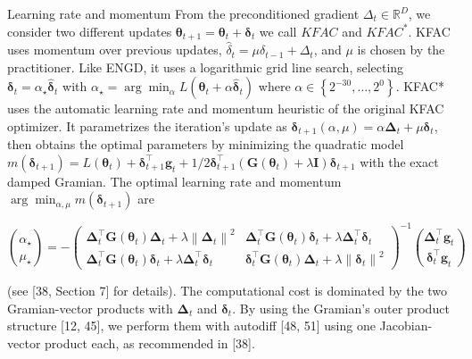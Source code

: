 \documentclass[10pt]{article}
\begin{document}
Learning rate and momentum From the preconditioned gradient $\Delta_{t} \in \mathbb{R}^{D}$, we consider two different updates $\boldsymbol{\theta}_{t+1}=\boldsymbol{\theta}_{t}+\boldsymbol{\delta}_{t}$ we call $K F A C$ and $K F A C^{*}$. KFAC uses momentum over previous updates, $\hat{\delta}_{t}=\mu \delta_{t-1}+\Delta_{t}$, and $\mu$ is chosen by the practitioner. Like ENGD, it uses a logarithmic grid line search, selecting $\boldsymbol{\delta}_{t}=\alpha_{\star} \hat{\boldsymbol{\delta}}_{t}$ with $\alpha_{\star}=\arg \min _{\alpha} L\left(\boldsymbol{\theta}_{t}+\alpha \hat{\boldsymbol{\delta}}_{t}\right)$ where $\alpha \in\left\{2^{-30}, \ldots, 2^{0}\right\}$. KFAC* uses the automatic learning rate and momentum heuristic of the original KFAC optimizer. It parametrizes the iteration's update as $\boldsymbol{\delta}_{t+1}(\alpha, \mu)=\alpha \boldsymbol{\Delta}_{t}+\mu \boldsymbol{\delta}_{t}$, then obtains the optimal parameters by minimizing the quadratic model $m\left(\boldsymbol{\delta}_{t+1}\right)=L\left(\boldsymbol{\theta}_{t}\right)+\boldsymbol{\delta}_{t+1}^{\top} \boldsymbol{g}_{t}+1 / 2 \boldsymbol{\delta}_{t+1}^{\top}\left(\boldsymbol{G}\left(\boldsymbol{\theta}_{t}\right)+\lambda \boldsymbol{I}\right) \boldsymbol{\delta}_{t+1}$ with the exact damped Gramian. The optimal learning rate and momentum $\arg \min _{\alpha, \mu} m\left(\boldsymbol{\delta}_{t+1}\right)$ are

$$
\binom{\alpha_{\star}}{\mu_{\star}}=-\left(\begin{array}{cc}
\boldsymbol{\Delta}_{t}^{\top} \boldsymbol{G}\left(\boldsymbol{\theta}_{t}\right) \boldsymbol{\Delta}_{t}+\lambda\left\|\boldsymbol{\Delta}_{t}\right\|^{2} & \boldsymbol{\Delta}_{t}^{\top} \boldsymbol{G}\left(\boldsymbol{\theta}_{t}\right) \boldsymbol{\delta}_{t}+\lambda \boldsymbol{\Delta}_{t}^{\top} \boldsymbol{\delta}_{t} \\
\boldsymbol{\Delta}_{t}^{\top} \boldsymbol{G}\left(\boldsymbol{\theta}_{t}\right) \boldsymbol{\delta}_{t}+\lambda \boldsymbol{\Delta}_{t}^{\top} \boldsymbol{\delta}_{t} & \boldsymbol{\delta}_{t}^{\top} \boldsymbol{G}\left(\boldsymbol{\theta}_{t}\right) \boldsymbol{\Delta}_{t}+\lambda\left\|\boldsymbol{\delta}_{t}\right\|^{2}
\end{array}\right)^{-1}\binom{\boldsymbol{\Delta}_{t}^{\top} \boldsymbol{g}_{t}}{\boldsymbol{\delta}_{t}^{\top} \boldsymbol{g}_{t}}
$$

(see [38, Section 7] for details). The computational cost is dominated by the two Gramian-vector products with $\boldsymbol{\Delta}_{t}$ and $\boldsymbol{\delta}_{t}$. By using the Gramian's outer product structure [12, 45], we perform them with autodiff [48, 51] using one Jacobian-vector product each, as recommended in [38].
\end{document}
